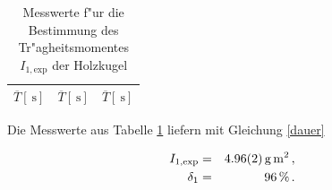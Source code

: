 				\begin{table}[h!]
					\begin{center}
						\caption{Messwerte f"ur die Bestimmung des Tr"agheitsmomentes $I_\mathrm{1, exp}$ der Holzkugel \label{tabelle:kugel}}
						\begin{tabular}{|c||c||c|}
							\hline
							$\overline{T} [\SI{}{\second}]$ & $\overline{T} [\SI{}{\second}]$ & $\overline{T} [\SI{}{\second}]$ \\
							\hline 
							\hline
							
							\hline 
						\end{tabular}
					\end{center}
				\end{table}

				Die Messwerte aus Tabelle \ref{tabelle:kugel} liefern mit Gleichung \eqref{dauer}

				\begin{eqnarray*}
					I_\mathrm{1, exp} & = & \SI{4.96 (2)}{\gram \meter \squared} \,, \\
					\delta_1 & = & \SI{96}{\percent} \,.
				\end{eqnarray*}

			\clearpage
